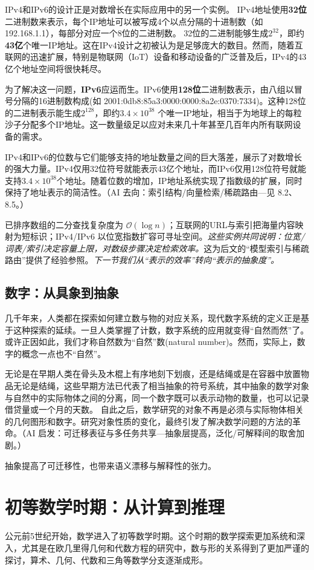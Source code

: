 IPv4和IPv6的设计正是对数增长在实际应用中的另一个实例。
 IPv4地址使用{\bf 32位}二进制数来表示，每个IP地址可以被写成4个以点分隔的十进制数（如192.168.1.1），每部分对应一个8位的二进制数。
32位的二进制能够生成$2^{32}$，即约{\bf 43亿}个唯一IP地址。这在IPv4设计之初被认为是足够庞大的数目。然而，随着互联网的迅速扩展，特别是物联网（IoT）设备和移动设备的广泛普及后，IPv4的43亿个地址空间将很快耗尽。

   为了解决这一问题，{\bf IPv6}应运而生。IPv6使用{\bf 128位}二进制数表示，由八组以冒号分隔的16进制数构成(如 2001:0db8:85a3:0000:0000:8a2e:0370:7334)。这种128位的二进制表示能生成$2^{128}$，即约{\bf $3.4 \times 10^{38} $} 个唯一IP地址，相当于为地球上的每粒沙子分配多个IP地址。这一数量级足以应对未来几十年甚至几百年内所有联网设备的需求。
   
IPv4和IPv6的位数与它们能够支持的地址数量之间的巨大落差，展示了对数增长的强大力量。IPv4仅用32位符号就能表示43亿个地址，而IPv6仅用128位符号就能支持{\bf $3.4 \times 10^{38}$}个地址。随着位数的增加，IP地址系统实现了指数级的扩展，同时保持了地址表示的简洁性。{（AI 去向：索引结构/向量检索/稀疏路由—见 8.2、8.5。）}

已排序数组的二分查找复杂度为 $\mathcal{O}(\log n)$；互联网的URL与索引把海量内容映射为短标识；IPv4/IPv6 以位宽指数扩容可寻址空间。\emph{这些实例共同说明：位宽/词表/索引决定容量上限，对数级步骤决定检索效率。}这为后文的“模型索引与稀疏路由”提供了经验参照。\emph{下一节我们从“表示的效率”转向“表示的抽象度”。}

\subsection{数字：从具象到抽象}
几千年来，人类都在探索如何建立数与物的对应关系，现代数字系统的定义正是基于这种探索的延续。一旦人类掌握了计数，数字系统的应用就变得“自然而然”了。或许正因如此，我们才称自然数为“自然”数(natural number)。然而，实际上，数字的概念一点也不“自然”。

无论是在早期人类在骨头及木棍上有序地刻下划痕，还是结绳或是在容器中放置物品无论是结绳，这些早期方法已代表了相当抽象的符号系统，其中抽象的数学对象与自然中的实际物体之间的分离，同一个数字既可以表示动物的数量，也可以记录借贷量或一个月的天数。
自此之后，数学研究的对象不再是必须与实际物体相关的几何图形和数字。研究对象性质的变化，最终引发了解决数学问题的方法的革命。{（AI 启发：可迁移表征与多任务共享—抽象层提高，泛化/可解释间的取舍加剧。）}

抽象提高了可迁移性，也带来语义漂移与解释性的张力。

\section{初等数学时期：从计算到推理}
公元前5世纪开始，数学进入了初等数学时期。这个时期的数学探索更加系统和深入，尤其是在欧几里得几何和代数方程的研究中，数与形的关系得到了更加严谨的探讨，算术、几何、代数和三角等数学分支逐渐成形。

